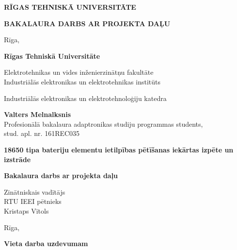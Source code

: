 \documentclass[12pt,fleqn,titlepage,oneside]{article}
\numberwithin{equation}{section}
\numberwithin{figure}{section}
\numberwithin{table}{section}
\newcommand{\authorName}{Valters Melnalksnis}
\newcommand{\authorId}{161REC035}
\begin{document}
\begin{titlepage}
	\centering
	\doublespacing
	
	{\Large\MakeUppercase{\textbf{Rīgas Tehniskā Universitāte}}\par}
	
	\vspace*{\fill}
	
	{\Huge\MakeUppercase{\textbf{Bakalaura darbs ar projekta daļu}}\par}
	
	\vspace*{\fill}
	
	{\Large Rīga, \the\year}
\end{titlepage}

\begin{titlepage}
	\centering
	\doublespacing
	{\Large \textbf{Rīgas Tehniskā Universitāte}}
	
	{Elektrotehnikas un vides inženierzinātņu fakultāte\\}
	{Industriālās elektronikas un elektrotehnikas institūts\\}
	{Industriālās elektronikas un elektrotehnoloģiju katedra\par}
	\vspace{2cm}
	
	\onehalfspacing
	{\Large \textbf{\authorName}\\}
	Profesionālā bakalaura adaptronikas studiju programmas students,\\
	stud. apl. nr. \authorId
	\vspace{2cm}
	
	{\huge \textbf{18650 tipa bateriju elementu ietilpības pētīšanas iekārtas izpēte un izstrāde}\par}
	
	\doublespacing
	{\Large\textbf{Bakalaura darbs ar projekta daļu}\par}
	\onehalfspacing
	\vspace{6cm}
	
	\raggedleft
	Zinātniskais vadītājs\\
	RTU IEEI pētnieks\\
	\doublespacing
	{\Large Kristaps Vītols}
	
	\centering
	\vfill
	Rīga, \the\year
\end{titlepage}

\begin{titlepage}
	\centering
	\vspace*{\fill}
	{\Large\textbf{Vieta darba uzdevumam}}
	\vspace*{\fill}
\end{titlepage}
\end{document}
